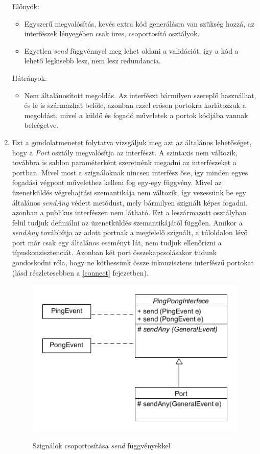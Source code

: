 \documentclass[a4paper,12pt]{report}
\begin{document}
\begin{enumerate}
Előnyök:
\begin{itemize}
\item Egyszerű megvalósítás, kevés extra kód generálásra van szükség hozzá, az interfészek lényegében csak üres, csoportosító osztályok.
\item Egyetlen \textit{send} függvénnyel meg lehet oldani a validációt, így a kód a lehető legkisebb lesz, nem lesz redundancia.
\end{itemize}
Hátrányok:
\begin{itemize}
\item Nem általánosított megoldás. Az interfészt bármilyen szereplő használhat, és le is származhat belőle, azonban ezzel erősen portokra korlátozzuk a megoldást, mivel a küldő és fogadó műveletek a portok kódjába vannak beleégetve.
\end{itemize}
\item Ezt a gondolatmenetet folytatva vizsgáljuk meg azt az általános lehetőséget, hogy a \textit{Port} osztály megvalósítja az interfészt. A szintaxis nem változik, továbbra is sablon paraméterként szeretnénk megadni az interfészeket a portban. Mivel most a szignáloknak nincsen interfész őse, így minden egyes fogadási végpont művelethez kelleni fog egy-egy függvény. Mivel az üzenetküldés végrehajtási szemantikája nem változik, így vezessünk be egy általános \textit{sendAny} védett metódust, mely bármilyen szignált képes fogadni, azonban a publikus interfészen nem látható. Ezt a leszármazott osztályban felül tudjuk definiálni az üzenetküldés szemantikájától függően. Amikor a \textit{sendAny} továbbítja az adott portnak a megfelelő szignált, a túloldalon lévő port már csak egy általános eseményt lát, nem tudjuk ellenőrizni a típuskonzisztenciát. Azonban két port összekapcsolásakor tudunk gondoskodni róla, hogy ne köthessünk össze inkonzisztens interfészű portokat (lásd részletesebben a \ref{connect} fejezetben). \\

\begin{figure}[H]
\begin{center}
\includegraphics[scale=0.7]{inf_ver2.png} \\
\end{center}
\caption{Szignálok csoportosítása \textit{send} függvényekkel}
\end{figure}



\end{enumerate}
\end{document}

